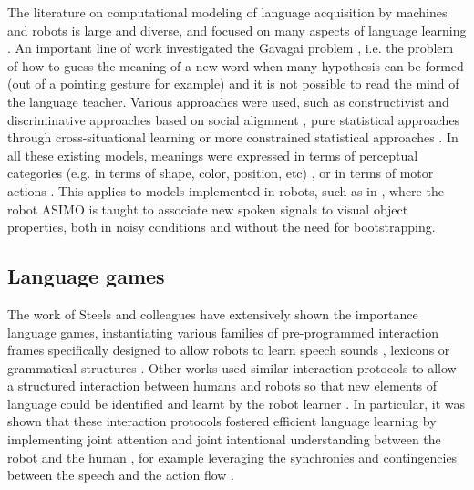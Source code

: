 The literature on computational modeling of language acquisition by machines and robots is large and diverse, and focused on many aspects of language learning \cite{steels2012grounding,steels2002aibos, cangelosi2010integration, kaplan2008computational, steels2003evolving, brent1997computational, yu2007unified}. An important line of work investigated the Gavagai problem \cite{quine1964word}, i.e. the problem of how to guess the meaning of a new word when many hypothesis can be formed (out of a pointing gesture for example) and it is not possible to read the mind of the language teacher. Various approaches were used, such as constructivist and discriminative approaches based on social alignment \cite{steels06spatialLanguage, steels2008can}, pure statistical approaches through cross-situational learning \cite{xu2007word, smith2008infants} or more constrained statistical approaches \cite{roy2005semiotic, yu2007unified}. In all these existing models, meanings were expressed in terms of perceptual categories (e.g. in terms of shape, color, position, etc) \cite{steels06spatialLanguage, steels2008can,yu2007unified}, or in terms of motor actions \cite{steels2008robot, Massera2010,sugita05a}. This applies to models implemented in robots, such as in \cite{heckmann2009teaching}, where the robot ASIMO is taught to associate new spoken signals to visual object properties, both in noisy conditions and without the need for bootstrapping. 

\subsection{Language games}

The work of Steels and colleagues \cite{steels2012grounding,steels2002aibos} have extensively shown the importance language games, instantiating various families of pre-programmed interaction frames specifically designed to allow robots to learn speech sounds \cite{de2000self,oudeyer2006self}, lexicons \cite{steels2002aibos} or grammatical structures \cite{steels06spatialLanguage, steels2008can}. Other works used similar interaction protocols to allow a structured interaction between humans and robots so that new elements of language could be identified and learnt by the robot learner \cite{roy02a,lyon2012interactive,cangelosi06b,yu2004multimodal,cangelosi2010integration,sugita05a,dominey2005learning,cederborg2011imitating}. In particular, it was shown that these interaction protocols fostered efficient language learning by implementing joint attention and joint intentional understanding between the robot and the human \cite{kaplan2006challenges,yu2005role,yu2007unified}, for example leveraging the synchronies and contingencies between the speech and the action flow \cite{rohlfing2006can,schillingmann2011acoustic}.

